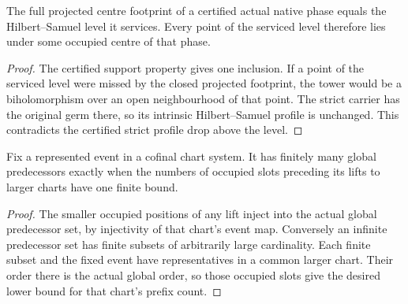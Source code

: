 \begin{theorem}
\label{hir:g8-native-phase-occupied-fibre}
\leanok
The full projected centre footprint of a certified actual native
phase equals the Hilbert--Samuel level it services. Every point
of the serviced level therefore lies under some occupied centre
of that phase.
\end{theorem}
\begin{proof}
The certified support property gives one inclusion. If a point of
the serviced level were missed by the closed projected footprint,
the tower would be a biholomorphism over an open neighbourhood
of that point. The strict carrier has the original germ there,
so its intrinsic Hilbert--Samuel profile is unchanged. This
contradicts the certified strict profile drop above the level.
\end{proof}

\begin{theorem}
\label{hir:g8-bounded-cofinal-prefix-counts}
\leanok
Fix a represented event in a cofinal chart system. It has finitely
many global predecessors exactly when the numbers of occupied
slots preceding its lifts to larger charts have one finite bound.
\end{theorem}
\begin{proof}
The smaller occupied positions of any lift inject into the actual
global predecessor set, by injectivity of that chart's event map.
Conversely an infinite predecessor set has finite subsets of
arbitrarily large cardinality. Each finite subset and the fixed
event have representatives in a common larger chart. Their order
there is the actual global order, so those occupied slots give
the desired lower bound for that chart's prefix count.
\end{proof}

